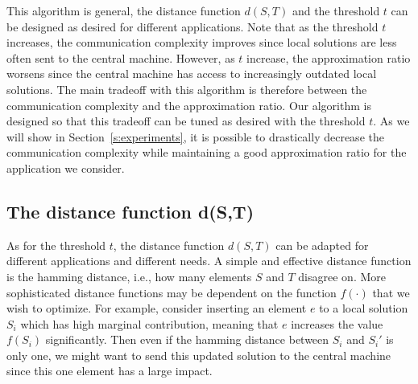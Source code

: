 This algorithm is general, the distance function $d(S,T)$ and the threshold $t$ can be designed as desired for different applications. Note that as the threshold $t$ increases, the communication complexity improves since local solutions are less often sent to the central machine. However, as $t$ increase, the approximation ratio worsens since the central machine has access to increasingly outdated local solutions.  The main tradeoff with this algorithm is therefore between the communication complexity and the approximation ratio. Our algorithm is designed so that this tradeoff can be tuned as desired with the threshold $t$. As we will show in Section~\ref{s:experiments}, it is possible to drastically decrease the communication complexity while maintaining a good approximation ratio for the application we consider.

\subsection{The distance function d(S,T)} As for the threshold $t$, the distance function $d(S,T)$ can be adapted for different applications and different needs. A simple and effective distance function is the hamming distance, i.e., how many elements $S$ and $T$ disagree on. More sophisticated distance functions may be dependent on the function $f(\cdot)$ that we wish to optimize. For example, consider inserting an element $e$ to a local solution $S_i$ which has high marginal contribution, meaning that $e$ increases the value $f(S_i)$ significantly. Then even if the hamming distance between $S_i$ and $S_i'$ is only one, we might want to send this updated solution to the central machine since this one element has a large impact.
